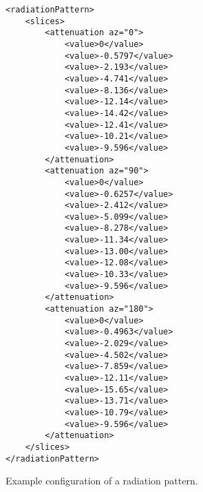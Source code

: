 \begin{listing}[h!]
\begin{verbatim}
<radiationPattern>
    <slices>
        <attenuation az="0">
            <value>0</value>
            <value>-0.5797</value>
            <value>-2.193</value>
            <value>-4.741</value>
            <value>-8.136</value>
            <value>-12.14</value>
            <value>-14.42</value>
            <value>-12.41</value>
            <value>-10.21</value>
            <value>-9.596</value>
        </attenuation>
        <attenuation az="90">
            <value>0</value>
            <value>-0.6257</value>
            <value>-2.412</value>
            <value>-5.099</value>
            <value>-8.278</value>
            <value>-11.34</value>
            <value>-13.00</value>
            <value>-12.08</value>
            <value>-10.33</value>
            <value>-9.596</value>
        </attenuation>
        <attenuation az="180">
            <value>0</value>
            <value>-0.4963</value>
            <value>-2.029</value>
            <value>-4.502</value>
            <value>-7.859</value>
            <value>-12.11</value>
            <value>-15.65</value>
            <value>-13.71</value>
            <value>-10.79</value>
            <value>-9.596</value>
        </attenuation>
    </slices>
</radiationPattern>
\end{verbatim}
\caption{Example configuration of a radiation pattern.}
\label{c:exampleRadiationConfig}
\end{listing}
